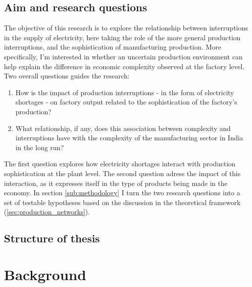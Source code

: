 \documentclass[11pt]{article}
\begin{document}
\subsection{Aim and research questions}%
\label{sub:aim_and_research_questions}
The objective of this research is to explore the relationship between interruptions in the supply of electricity, here taking the role of the more general production interruptions, and the sophistication of manufacturing production. More specifically, I'm interested in whether an uncertain production environment can help explain the difference in economic complexity observed at the factory level. Two overall questions guides the research: 


\begin{enumerate}

\item How is the impact of production interruptions - in the form of electricity shortages - on factory output related to the sophistication of the factory's production?

\item What relationship, if any, does this association between complexity and interruptions have with the complexity of the manufacturing sector in India in the long run?

\end{enumerate}

The first question explores how electricity shortages interact with production sophistication at the plant level. The second question adress the impact of this interaction, as it expresses itself in the type of products being made in the economy. In section \ref{sub:methodology} I turn the two research questions into a set of testable hypotheses based on the discussion in the theoretical framework (\ref{sec:production_networks}).

\subsection{Structure of thesis}%
\label{sub:structure_of_thesis}


\newpage
\section{Background}%
\label{sec:background}
\end{document}
